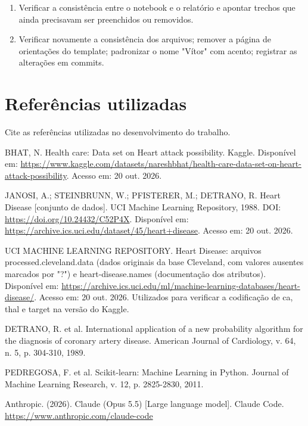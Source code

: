 \documentclass[11pt,letterpaper]{article}
\begin{document}
\begin{enumerate}
\item Verificar a consistência entre o notebook e o relatório e apontar trechos que ainda precisavam ser preenchidos ou removidos.
\item Verificar novamente a consistência dos arquivos; remover a página de orientações do template; padronizar o nome "Vítor" com acento; registrar as alterações em commits.
\end{enumerate}

\Needspace{140pt}
\section*{Referências utilizadas}

Cite as referências utilizadas no desenvolvimento do trabalho.

BHAT, N. Health care: Data set on Heart attack possibility. Kaggle. Disponível em: \url{https://www.kaggle.com/datasets/nareshbhat/health-care-data-set-on-heart-attack-possibility}. Acesso em: 20 out. 2026.

JANOSI, A.; STEINBRUNN, W.; PFISTERER, M.; DETRANO, R. Heart Disease [conjunto de dados]. UCI Machine Learning Repository, 1988. DOI: \url{https://doi.org/10.24432/C52P4X}. Disponível em: \url{https://archive.ics.uci.edu/dataset/45/heart+disease}. Acesso em: 20 out. 2026.

UCI MACHINE LEARNING REPOSITORY. Heart Disease: arquivos processed.cleveland.data (dados originais da base Cleveland, com valores ausentes marcados por "?") e heart-disease.names (documentação dos atributos). Disponível em: \url{https://archive.ics.uci.edu/ml/machine-learning-databases/heart-disease/}. Acesso em: 20 out. 2026. Utilizados para verificar a codificação de ca, thal e target na versão do Kaggle.

DETRANO, R. et al. International application of a new probability algorithm for the diagnosis of coronary artery disease. American Journal of Cardiology, v. 64, n. 5, p. 304-310, 1989.

PEDREGOSA, F. et al. Scikit-learn: Machine Learning in Python. Journal of Machine Learning Research, v. 12, p. 2825-2830, 2011.

Anthropic. (2026). Claude (Opus 5.5) [Large language model]. Claude Code. \url{https://www.anthropic.com/claude-code}
\end{document}
